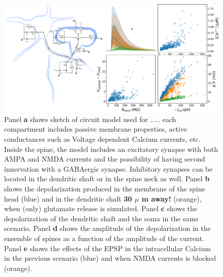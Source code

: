 \documentclass[10pt,letterpaper]{article}
\begin{document}





\begin{figure}[htb!]
\includegraphics[width=1.0\linewidth]{Figure_Model_1}
\caption{ Panel {\bf a} shows sketch of circuit model used for ..... each compartment includes passive membrane properties, active conductances such as Voltage dependent Calcium currents, etc. Inside the spine, the model includes an excitatory synapse with both AMPA and NMDA currents and the possibility of having second innervation with a GABAergic synapse. Inhibitory synapses can be located in the dendritic shaft or in the spine neck as well. Panel {\bf  b} shows the depolarization produced in the membrane of the spine head (blue) and in the dendritic shaft {\bf 30 $\mu$ m away!} (orange), when (only) glutamate release is simulated.  Panel {\bf c} shows the depolarization of the dendritic shaft and the soma in the same scenario. Panel {\bf d} shows the amplitude of the depolarization in the ensemble of spines as a function of the amplitude of the current. Panel {\bf e} shows the effects of the EPSP in the intracellular Calcium in the previous scenario (blue) and when NMDA currents is blocked (orange). \label{fig: base model }}
\end{figure}
\end{document}
